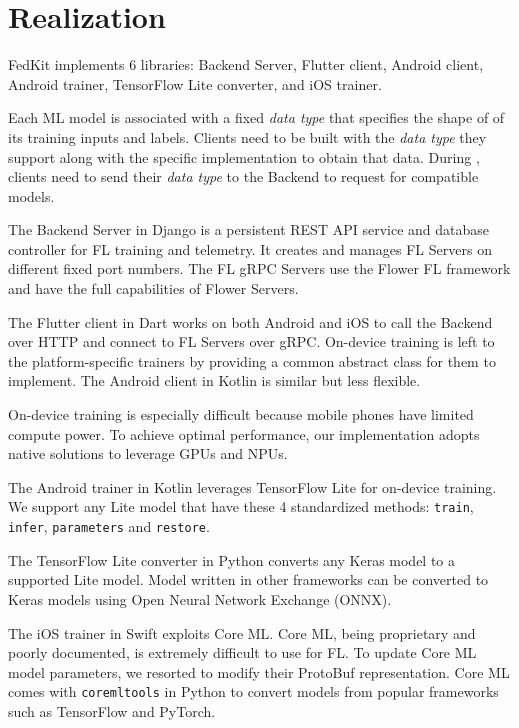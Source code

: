 \documentclass[letterpaper]{article} %
\begin{document}
\section{Realization}

\newcommand{\dt}{\textit{data type}}

FedKit implements 6 libraries:
Backend Server,
Flutter client,
Android client,
Android trainer,
TensorFlow Lite converter, and
iOS trainer.

Each ML model is associated with a fixed \dt{} that specifies the shape of
of its training inputs and labels.
Clients need to be built with the \dt{} they support along with
the specific implementation to obtain that data.
During \modelreq, clients need to send their \dt{} to the Backend to
request for compatible models.

The Backend Server in Django is a persistent REST API service and database
controller for FL training and telemetry.
It creates and manages FL Servers on different fixed port numbers.
The FL gRPC Servers use the Flower FL framework \cite{beutel2020flower} and
have the full capabilities of Flower Servers.

The Flutter client in Dart works on both Android and iOS to
call the Backend over HTTP and connect to FL Servers over gRPC.
On-device training is left to the platform-specific trainers
by providing a common abstract class for them to implement.
The Android client in Kotlin is similar but less flexible.

On-device training is especially difficult because mobile phones have limited
compute power.
To achieve optimal performance, our implementation adopts native solutions
to leverage GPUs and NPUs.

The Android trainer in Kotlin leverages TensorFlow Lite for on-device training.
We support any Lite model that have these 4 standardized methods:
\lstinline{train},
\lstinline{infer},
\lstinline{parameters} and
\lstinline{restore}.

The TensorFlow Lite converter in Python converts any Keras model to
a supported Lite model.
Model written in other frameworks can be converted to Keras models using
Open Neural Network Exchange (ONNX).

The iOS trainer in Swift exploits Core ML.
Core ML, being proprietary and poorly documented,
is extremely difficult to use for FL.
To update Core ML model parameters,
we resorted to modify their ProtoBuf representation.
Core ML comes with \lstinline{coremltools} in Python to convert models from
popular frameworks such as TensorFlow and PyTorch.
\end{document}
